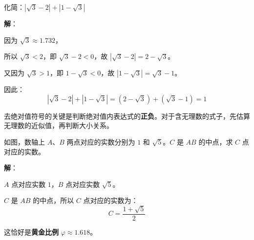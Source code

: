 \documentclass[12pt, a4paper]{ctexart}
\begin{document}
\vspace{6pt}

\begin{examplebox}[【例题6】实数的绝对值与化简]
化简：$|\sqrt{3} - 2| + |1 - \sqrt{3}|$
\end{examplebox}

\textbf{解}：

因为 $\sqrt{3} \approx 1.732$，

所以 $\sqrt{3} < 2$，即 $\sqrt{3} - 2 < 0$，故 $|\sqrt{3} - 2| = 2 - \sqrt{3}$。

又因为 $\sqrt{3} > 1$，即 $1 - \sqrt{3} < 0$，故 $|1 - \sqrt{3}| = \sqrt{3} - 1$。

因此：
\[
|\sqrt{3} - 2| + |1 - \sqrt{3}| = (2 - \sqrt{3}) + (\sqrt{3} - 1) = 1
\]

\begin{tipbox}[方法总结]
去绝对值符号的关键是判断绝对值内表达式的\textbf{正负}。对于含无理数的式子，先估算无理数的近似值，再判断大小关系。
\end{tipbox}

\vspace{6pt}

\begin{examplebox}
如图，数轴上 $A$、$B$ 两点对应的实数分别为 $1$ 和 $\sqrt{5}$。$C$ 是 $AB$ 的中点，求 $C$ 点对应的实数。

\begin{center}
\end{center}
\end{examplebox}

\textbf{解}：

$A$ 点对应实数 $1$，$B$ 点对应实数 $\sqrt{5}$。

$C$ 是 $AB$ 的中点，所以 $C$ 点对应的实数为：
\[
C = \frac{1 + \sqrt{5}}{2}
\]

这恰好是\textbf{黄金比例} $\varphi \approx 1.618$。

\end{document}
